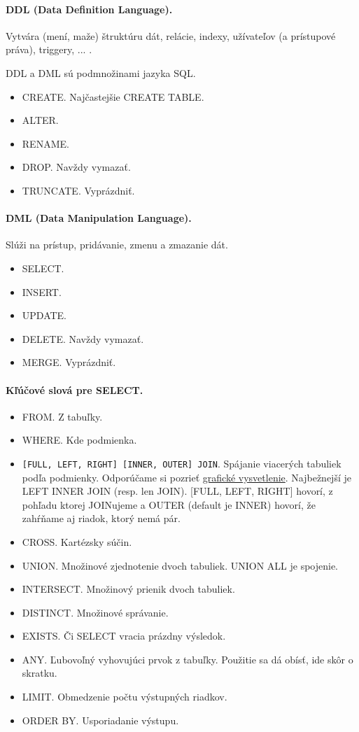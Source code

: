 \documentclass[10pt,a4paper]{article}
\begin{document}
\paragraph{DDL (Data Definition Language).}
Vytvára (mení, maže) štruktúru dát, relácie, indexy, užívateľov (a prístupové práva), triggery, ... . 

DDL a DML sú podmnožinami jazyka SQL. 

\begin{itemize}
\item CREATE. Najčastejšie CREATE TABLE.
\item ALTER. 
\item RENAME.
\item DROP. Navždy vymazať. 
\item TRUNCATE. Vyprázdniť. 
\end{itemize}

\paragraph{DML (Data Manipulation Language).}
Slúži na prístup, pridávanie, zmenu a zmazanie dát. 

\begin{itemize}
\item SELECT. 
\item INSERT. 
\item UPDATE.
\item DELETE. Navždy vymazať. 
\item MERGE. Vyprázdniť. 
\end{itemize}

\paragraph{Kľúčové slová pre SELECT.}
\begin{itemize}
\item FROM. Z tabuľky.  
\item WHERE. Kde podmienka. 
\item \verb|[FULL, LEFT, RIGHT] [INNER, OUTER] JOIN|. Spájanie viacerých tabuliek podľa podmienky. Odporúčame si pozrieť \href{http://www.codinghorror.com/blog/2007/10/a-visual-explanation-of-sql-joins.html}{grafické vysvetlenie}. Najbežnejší je LEFT INNER JOIN (resp. len JOIN). [FULL, LEFT, RIGHT] hovorí, z pohľadu ktorej JOINujeme a OUTER (default je INNER) hovorí, že zahŕňame aj riadok, ktorý nemá pár. 
\item CROSS. Kartézsky súčin. 
\item UNION. Množinové zjednotenie dvoch tabuliek. UNION ALL je spojenie.
\item INTERSECT. Množinový prienik dvoch tabuliek. 
\item DISTINCT. Množinové správanie.    
\item EXISTS. Či SELECT vracia prázdny výsledok. 
\item ANY. Ľubovoľný vyhovujúci prvok z tabuľky. Použitie sa dá obísť, ide skôr o skratku. 
\item LIMIT. Obmedzenie počtu výstupných riadkov.
\item ORDER BY. Usporiadanie výstupu.
\end{itemize}
\end{document}
